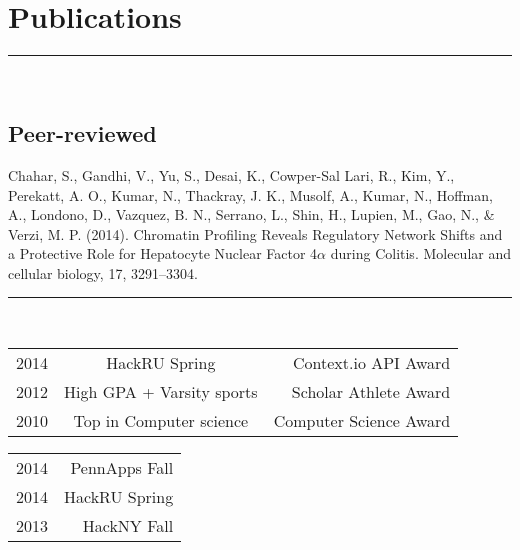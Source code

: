 \documentclass[letterpaper]{deedy-resume} %
\begin{document}
\sectionspace

\section{Publications}
\hrule \leavevmode \\
\vspace{2 mm}
\subsection{Peer-reviewed}
\textbullet{} Chahar, S., Gandhi, V., Yu, S., Desai, K., Cowper-Sal Lari, R., Kim, Y., Perekatt, A. O., Kumar, N., Thackray, J. K., Musolf, A., Kumar, N., Hoffman, A., Londono, D., Vazquez, B. N., Serrano, L., Shin, H., Lupien, M., Gao, N., \& Verzi, M. P. (2014). Chromatin Profiling Reveals Regulatory Network Shifts and a Protective Role for Hepatocyte Nuclear Factor 4$\alpha$ during Colitis. Molecular and cellular biology, 17, 3291–3304.

\sectionspace

\hfill
{}
\vspace{1 mm}
\hrule \leavevmode \\
\vspace{2 mm}
\normalfont
\fontsize{10pt}{12pt}
\selectfont
\begin{minipage}[t]{0.66\textwidth}
\begin{tabular}{lcr}
2014 & HackRU Spring & Context.io API Award \\
2012 & High GPA + Varsity sports & Scholar Athlete Award \\
2010 & Top in Computer science & Computer Science Award\\

\end{tabular}
\end{minipage}
\begin{minipage}[t]{0.33\textwidth}
\hfill	
\begin{tabular}{lr}
2014 & PennApps Fall \\ 
2014 & HackRU Spring  \\
2013 & HackNY Fall \\

\end{tabular}    
\end{minipage}




\sectionspace %

\end{document}
